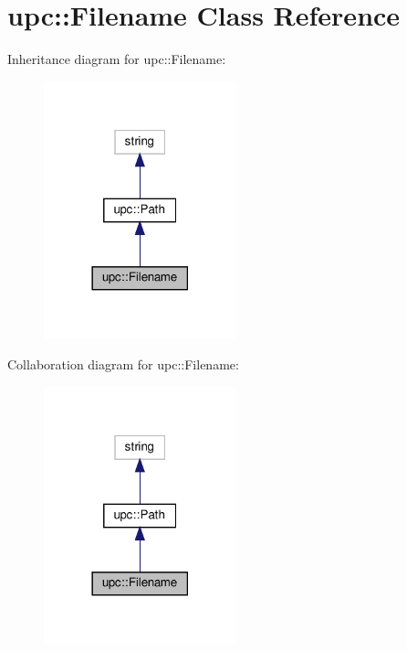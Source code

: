 \hypertarget{classupc_1_1Filename}{}\section{upc\+:\+:Filename Class Reference}
\label{classupc_1_1Filename}


Inheritance diagram for upc\+:\+:Filename\+:
\nopagebreak
\begin{figure}[H]
\begin{center}
\leavevmode
\includegraphics[width=158pt]{classupc_1_1Filename__inherit__graph}
\end{center}
\end{figure}


Collaboration diagram for upc\+:\+:Filename\+:
\nopagebreak
\begin{figure}[H]
\begin{center}
\leavevmode
\includegraphics[width=158pt]{classupc_1_1Filename__coll__graph}
\end{center}
\end{figure}
